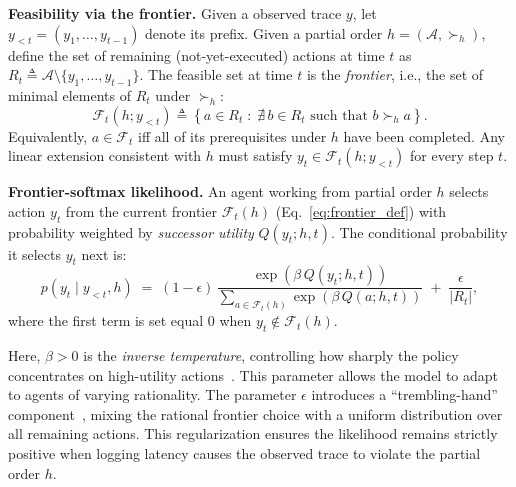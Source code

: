 \documentclass{article}
\theoremstyle{plain}
\theoremstyle{definition}
\theoremstyle{remark}
\begin{document}
\noindent \textbf{Feasibility via the frontier.}
Given a observed trace $y$, let $y_{<t}=(y_1,\ldots,y_{t-1})$ denote its prefix.
Given a partial order $h=(\mathcal{A},\succ_{h})$, define the set of
remaining (not-yet-executed) actions at time $t$ as
$R_t \triangleq \mathcal{A}\setminus \{y_1,\ldots,y_{t-1}\}$.
The feasible set at time $t$ is the \emph{frontier}, i.e., the set of minimal elements of $R_t$
under $\succ_{h}$:
\begin{equation}
\mathcal{F}_t\!\left(h;y_{<t}\right)
\triangleq
\left\{
a\in R_t \;:\; \nexists\, b\in R_t \text{ such that } b \succ_{h} a
\right\}.
\label{eq:frontier_def}
\end{equation}
Equivalently, $a\in \mathcal{F}_t$ iff all of its  prerequisites under $h$
have been completed.
Any linear extension consistent with $h$ must satisfy $y_t\in \mathcal{F}_t(h;y_{<t})$ for every step $t$.

\noindent \textbf{Frontier-softmax likelihood.}
An agent working from partial order $h$ selects action $y_t$ from the current frontier $\mathcal{F}_t(h)$ (Eq.~\ref{eq:frontier_def}) with probability weighted by \emph{successor utility} $Q(y_t;h,t)$. The conditional probability it selects $y_t$ next is:
\begin{equation}
p(y_t \mid y_{<t}, h)
\;=\;
(1-\epsilon)\,
\frac{\exp\!\left(\beta\, Q(y_t;h,t)\right)}
{\sum_{a\in \mathcal{F}_t(h)} \exp\!\left(\beta\, Q(a;h,t)\right)}
\;+\;
\frac{\epsilon}{|R_t|},
\label{eq:frontier_softmax}
\end{equation}
where the first term is set equal $0$ when $y_t\notin\mathcal{F}_t(h)$.

Here, $\beta > 0$ is the \emph{inverse temperature}, controlling how sharply the policy concentrates on high-utility actions~\citep{sutton2018reinforcement}. This parameter allows the model to adapt to agents of varying rationality. The parameter $\epsilon$ introduces a ``trembling-hand'' component~\citep{selten1975reexamination}, mixing the rational frontier choice with a uniform distribution over all remaining actions. This regularization ensures the likelihood remains strictly positive when logging latency causes the observed trace to violate the partial order $h$.
\end{document}

